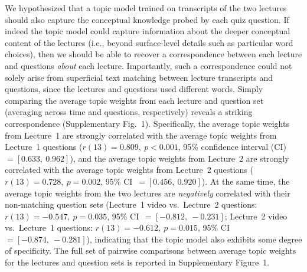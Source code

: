 \documentclass[10pt]{article}
\newcommand{\topicWeights}{1}
\begin{document}
We hypothesized that a topic model trained on transcripts of the two lectures
should also capture the conceptual knowledge probed by each quiz question. If
indeed the topic model could capture information about the deeper conceptual
content of the lectures (i.e., beyond surface-level details such as particular
word choices), then we should be able to recover a correspondence between each
lecture and questions \textit{about} each lecture. Importantly, such a
correspondence could not solely arise from superficial text matching between
lecture transcripts and questions, since the lectures and questions used
different words. Simply comparing the average topic weights from each lecture
and question set (averaging across time and questions, respectively) reveals a
striking correspondence (Supplementary Fig.~\topicWeights). Specifically, the average topic
weights from Lecture~1 are strongly correlated with the average topic weights
from Lecture~1 questions ($r(13) = 0.809,~p < 0.001$, 95\% confidence interval
(CI)~$= [0.633,~0.962]$), and the average topic weights from Lecture~2 are
strongly correlated with the average topic weights from Lecture~2 questions
($r(13) = 0.728,~p = 0.002$, 95\% CI~$= [0.456,~0.920]$). At the same time, the
average topic weights from the two lectures are \textit{negatively} correlated with
their non-matching question sets (Lecture~1 video vs.~Lecture~2 questions: $r(13) =
-0.547,~p = 0.035$, 95\% CI~$= [-0.812, ~-0.231]$; Lecture~2 video vs.~Lecture~1 questions: $r(13)
= -0.612,~p = 0.015$, 95\% CI~$= [-0.874,~-0.281]$), indicating that the topic model
also exhibits some degree of specificity. The full set of pairwise comparisons
between average topic weights for the lectures and question sets is reported in
Supplementary Figure~\topicWeights.
\end{document}
